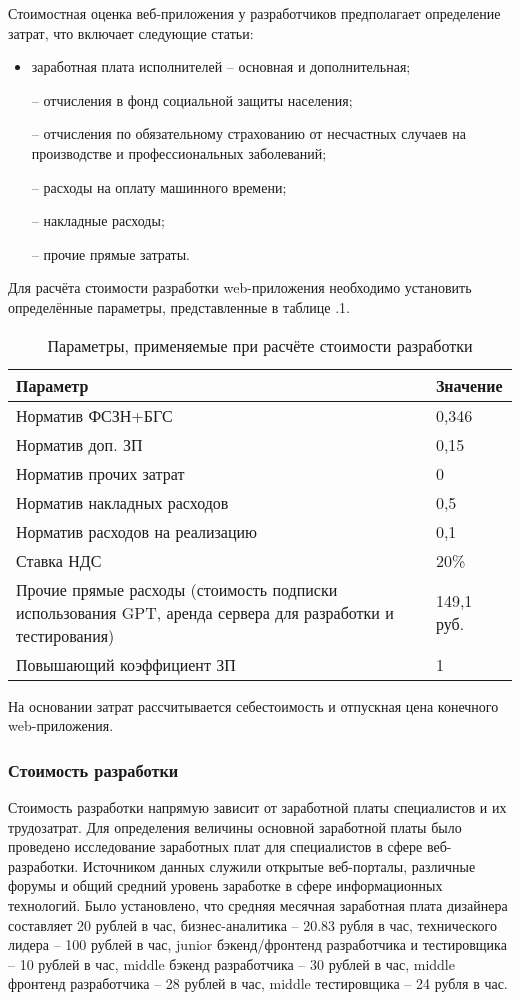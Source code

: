 \documentclass[14pt]{extarticle}
\begin{document}
Стоимостная оценка веб-приложения у разработчиков предполагает определение затрат, что включает следующие статьи:
\begin{itemize}
    \item заработная плата исполнителей -- основная и дополнительная;
    \item[--] отчисления в фонд социальной защиты населения;
    \item[--] отчисления по обязательному страхованию от несчастных случаев на производстве и профессиональных заболеваний;
    \item[--] расходы на оплату машинного времени;
    \item[--] накладные расходы;
    \item[--] прочие прямые затраты.
\end{itemize}

Для расчёта стоимости разработки web-приложения необходимо установить определённые параметры, представленные в таблице \thesection.1.

\begin{longtable}{|p{10cm}|p{7cm}|}
    \caption{Параметры, применяемые при расчёте стоимости разработки} \\
    \hline
    Параметр & Значение \\ \hline
    \endfirsthead
    Норматив ФСЗН+БГС & 0,346 \\ \hline
    Норматив доп. ЗП & 0,15 \\ \hline
    Норматив прочих затрат & 0 \\ \hline
    Норматив накладных расходов & 0,5 \\ \hline
    Норматив расходов на реализацию & 0,1 \\ \hline
    Ставка НДС & 20\% \\ \hline
    Прочие прямые расходы (стоимость подписки использования GPT, аренда сервера для разработки и тестирования) & 149,1 руб. \\ \hline
    Повышающий коэффициент ЗП & 1 \\ \hline
\end{longtable}

На основании затрат рассчитывается себестоимость и отпускная цена конечного web-приложения.

\subsubsection{Стоимость разработки}

Стоимость разработки напрямую зависит от заработной платы специалистов и их трудозатрат. Для определения величины основной заработной платы было проведено исследование заработных плат для специалистов в сфере веб-разработки. Источником данных служили открытые веб-порталы, различные форумы и общий средний уровень заработке в сфере информационных технологий. Было установлено, что средняя месячная заработная плата дизайнера составляет 20 рублей в час, бизнес-аналитика -- 20.83 рубля в час, технического лидера -- 100 рублей в час, junior бэкенд/фронтенд разработчика и тестировщика -- 10 рублей в час, middle бэкенд разработчика -- 30 рублей в час, middle фронтенд разработчика -- 28 рублей в час, middle тестировщика -- 24 рубля в час.
\end{document}
